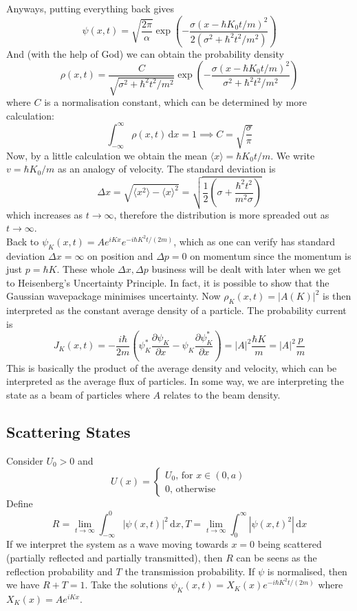 Anyways, putting everything back gives
$$\psi(x,t)=\sqrt{\frac{2\pi}{\alpha}}\exp\left( -\frac{\sigma(x-\hbar K_0t/m)^2}{2(\sigma^2+\hbar^2t^2/m^2)} \right)$$
And (with the help of God) we can obtain the probability density
$$\rho(x,t)=\frac{C}{\sqrt{\sigma^2+\hbar^2t^2/m^2}}\exp\left( -\frac{\sigma(x-\hbar K_0t/m)^2}{\sigma^2+\hbar^2t^2/m^2} \right)$$
where $C$ is a normalisation constant, which can be determined by more calculation:
$$\int_{-\infty}^\infty\rho(x,t)\,\mathrm dx=1\implies C=\sqrt{\frac{\sigma}{\pi}}$$
Now, by a little calculation we obtain the mean $\langle x\rangle=\hbar K_0t/m$.
We write $v=\hbar K_0/m$ as an analogy of velocity.
The standard deviation is
$$\Delta x=\sqrt{\langle x^2\rangle-\langle x\rangle^2}=\sqrt{\frac{1}{2}\left( \sigma+\frac{\hbar^2t^2}{m^2\sigma} \right)}$$
which increases as $t\to\infty$, therefore the distribution is more spreaded out as $t\to\infty$.\\
Back to $\psi_K(x,t)=Ae^{iKx}e^{-i\hbar K^2t/(2m)}$, which as one can verify has standard deviation $\Delta x=\infty$ on position and $\Delta p=0$ on momentum since the momentum is just $p=\hbar K$.
These whole $\Delta x,\Delta p$ business will be dealt with later when we get to Heisenberg's Uncertainty Principle.
In fact, it is possible to show that the Gaussian wavepackage minimises uncertainty.
Now $\rho_K(x,t)=|A(K)|^2$ is then interpreted as the constant average density of a particle.
The probability current is
$$J_K(x,t)=-\frac{i\hbar}{2m}\left( \psi_K^*\frac{\partial\psi_K}{\partial x}-\psi_K\frac{\partial\psi_K^*}{\partial x} \right)=|A|^2\frac{\hbar K}{m}=|A|^2\frac{p}{m}$$
This is basically the product of the average density and velocity, which can be interpreted as the average flux of particles.
In some way, we are interpreting the state as a beam of particles where $A$ relates to the beam density.
\subsection{Scattering States}
Consider $U_0>0$ and
$$U(x)=\begin{cases}
    U_0\text{, for $x\in (0,a)$}\\
    0\text{, otherwise}
\end{cases}$$
Define
$$R=\lim_{t\to\infty}\int_{-\infty}^0|\psi(x,t)|^2\,\mathrm dx,T=\lim_{t\to\infty}\int_0^\infty|\psi(x,t)^2|\,\mathrm dx$$
If we interpret the system as a wave moving towards $x=0$ being scattered (partially reflected and partially transmitted), then $R$ can be seens as the reflection probability and $T$ the transmission probability.
If $\psi$ is normalised, then we have $R+T=1$.
Take the solutions $\psi_K(x,t)=X_K(x)e^{-i\hbar K^2t/(2m)}$ where $X_K(x)=Ae^{iKx}$.
